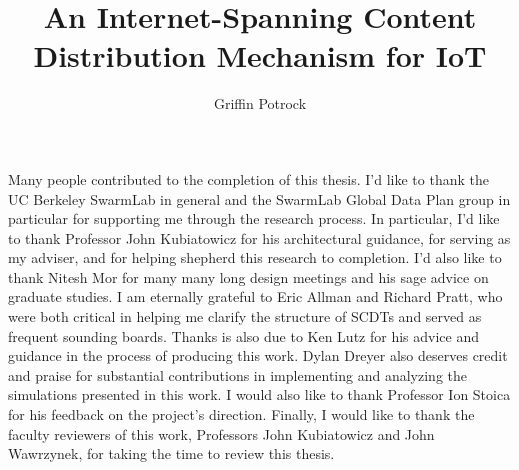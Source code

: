 \documentclass[masters]{ucbthesis}
\begin{document}

\title{An Internet-Spanning Content Distribution Mechanism for IoT}
\author{Griffin Potrock}




\maketitle
\approvalpage
\copyrightpage



\begin{frontmatter}


\tableofcontents
\clearpage
\listoffigures
\clearpage
\listoftables

\begin{acknowledgements}
Many people contributed to the completion of this thesis. I'd like to thank the UC Berkeley SwarmLab in general and the SwarmLab Global Data Plan group in particular for supporting me through the research process. In particular, I'd like to thank Professor John Kubiatowicz for his architectural guidance, for serving as my adviser, and for helping shepherd this research to completion. I'd also like to thank Nitesh Mor for many many long design meetings and his sage advice on graduate studies. I am eternally grateful to Eric Allman and Richard Pratt, who were both critical in helping me clarify the structure of SCDTs and served as frequent sounding boards. Thanks is also due to Ken Lutz for his advice and guidance in the process of producing this work. Dylan Dreyer also deserves credit and praise for substantial contributions in implementing and analyzing the simulations presented in this work.  I would also like to thank Professor Ion Stoica for his feedback on the project's direction.  Finally, I would like to thank the faculty reviewers of this work, Professors John Kubiatowicz and John Wawrzynek, for taking the time to review this thesis.
\end{acknowledgements}

\end{frontmatter}

\pagestyle{headings}









\printbibliography
\end{document}
